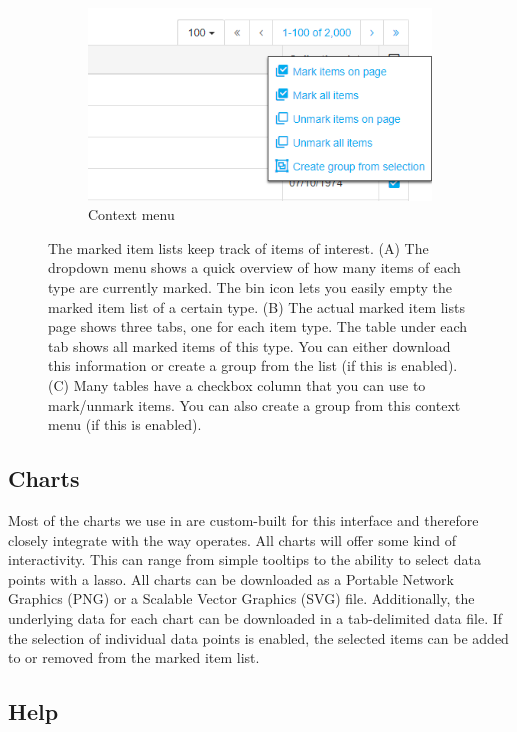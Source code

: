 \begin{figure}
	\begin{subfigure}[b]{0.2\linewidth}
		\includegraphics[width=1\linewidth]{img/features/item-list-context-create-group.png}
		\caption{Context menu}
		\label{fig:features:marked-items-context}
	\end{subfigure}
	\caption{The marked item lists keep track of items of interest. (A) The dropdown menu shows a quick overview of how many items of each type are currently marked. The bin icon lets you easily empty the marked item list of a certain type. (B) The actual marked item lists page shows three tabs, one for each item type. The table under each tab shows all marked items of this type. You can either download this information or create a group from the list (if this is enabled). (C) Many tables have a checkbox column that you can use to mark/unmark items. You can also create a group from this context menu (if this is enabled).}
\end{figure}

\subsection{Charts}
Most of the charts we use in {\germinate} are custom-built for this interface and therefore closely integrate with the way {\germinate} operates. All charts will offer some kind of interactivity. This can range from simple tooltips to the ability to select data points with a lasso. All charts can be downloaded as a Portable Network Graphics (PNG) or a Scalable Vector Graphics (SVG) file. Additionally, the underlying data for each chart can be downloaded in a tab-delimited data file. If the selection of individual data points is enabled, the selected items can be added to or removed from the marked item list.

\subsection{Help}
\label{sec:features:help}

